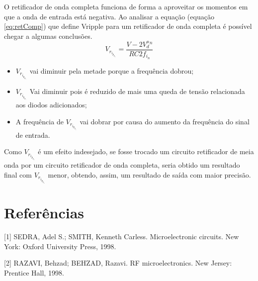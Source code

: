 \documentclass{abntex2}
\begin{document}
O retificador de onda completa funciona de forma a aproveitar os momentos em que a onda de entrada está negativa. Ao analisar a equação (equação  \ref{eq:retComp}) que define Vripple para um retificador de onda completa é possível
chegar a algumas conclusões.
\begin{equation}
  V_r_i_p_p_l_e = \frac{V-2V_d^o^n}{RC2f_i_n}
  \label{eq:retComp}
\end{equation}

\begin{itemize}
  \item $V_r_i_p_p_l_e$ vai diminuir pela metade porque a frequência dobrou;
  \item $V_r_i_p_p_l_e$ Vai diminuir pois é reduzido de mais uma queda de tensão relacionada aos diodos adicionados;
  \item A frequência de $V_r_i_p_p_l_e$ vai dobrar por causa do aumento da frequência do sinal de entrada.
\end{itemize}

Como $V_r_i_p_p_l_e$ é um efeito indesejado, se fosse trocado um circuito retificador de meia onda por um circuito retificador de onda completa,
seria obtido um resultado final com $V_r_i_p_p_l_e$ menor, obtendo, assim, um resultado de saída com maior precisão.

\section*{Referências}


[1] SEDRA, Adel S.; SMITH, Kenneth Carless. Microelectronic circuits. New York: Oxford University Press, 1998.

[2] RAZAVI, Behzad; BEHZAD, Razavi. RF microelectronics. New Jersey: Prentice Hall, 1998.
\end{document}
